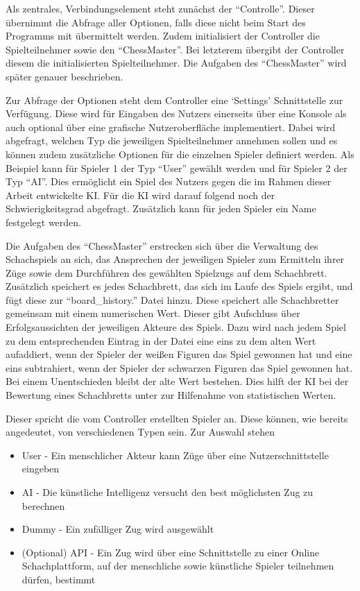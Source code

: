 Als zentrales, Verbindungselement steht zunächst der ``Controlle''. Dieser übernimmt die Abfrage aller Optionen, falls diese nicht beim Start des Programms mit übermittelt werden. Zudem initialisiert der Controller die Spielteilnehmer sowie den ``ChessMaster''. Bei letzterem übergibt der Controller diesem die initialisierten Spielteilnehmer. Die Aufgaben des ``ChessMaster'' wird später genauer beschrieben.

Zur Abfrage der Optionen steht dem Controller eine `Settings' Schnittstelle zur Verfügung. Diese wird für Eingaben des Nutzers einerseits über eine Konsole als auch optional über eine grafische Nutzeroberfläche implementiert. Dabei wird abgefragt, welchen Typ die jeweiligen Spielteilnehmer annehmen sollen und es können zudem zusätzliche Optionen für die einzelnen Spieler definiert werden. Als Beispiel kann für Spieler 1 der Typ ``User'' gewählt werden und für Spieler 2 der Typ ``AI''. Dies ermöglicht ein Spiel des Nutzers gegen die im Rahmen dieser Arbeit entwickelte KI. Für die KI wird darauf folgend noch der Schwierigkeitsgrad abgefragt. Zusätzlich kann für jeden Spieler ein Name festgelegt werden.

Die Aufgaben des ``ChessMaster'' erstrecken sich über die Verwaltung des Schachspiels an sich, das Ansprechen der jeweiligen Spieler zum Ermitteln ihrer Züge sowie dem Durchführen des gewählten Spielzugs auf dem Schachbrett. Zusätzlich speichert es jedes Schachbrett, das sich im Laufe des Spiels ergibt, und fügt diese zur ``board\_history.'' Datei hinzu. Diese speichert alle Schachbretter gemeinsam mit einem numerischen Wert. Dieser gibt Aufschluss über Erfolgsaussichten der jeweiligen Akteure des Spiels. Dazu wird nach jedem Spiel zu dem entsprechenden Eintrag in der Datei eine eins zu dem alten Wert aufaddiert, wenn der Spieler der weißen Figuren das Spiel gewonnen hat und eine eins subtrahiert, wenn der Spieler der schwarzen Figuren das Spiel gewonnen hat. Bei einem Unentschieden bleibt der alte Wert bestehen. Dies hilft der KI bei der Bewertung eines Schachbretts unter zur Hilfenahme von statistischen Werten. 

Dieser spricht die vom Controller erstellten Spieler an. Diese können, wie bereits angedeutet, von verschiedenen Typen sein. Zur Auswahl stehen
\begin{itemize}
\item User - Ein menschlicher Akteur kann Züge über eine Nutzerschnittstelle eingeben
\item AI - Die künstliche Intelligenz versucht den best möglichsten Zug zu berechnen
\item Dummy - Ein zufälliger Zug wird ausgewählt
\item (Optional) API - Ein Zug wird über eine Schnittstelle zu einer Online Schachplattform, auf der menschliche sowie künstliche Spieler teilnehmen dürfen, bestimmt
\end{itemize}

